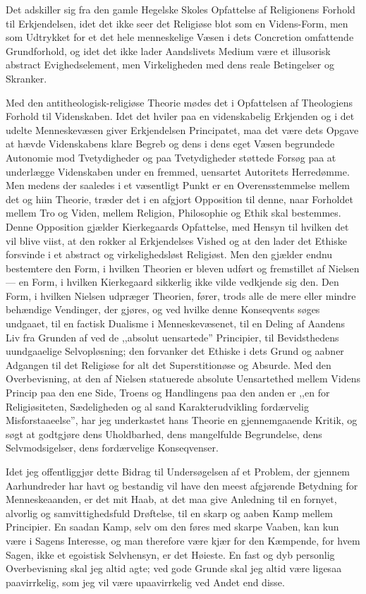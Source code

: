 \documentclass[12pt,a4paper]{article}
\begin{document}
Det adskiller sig fra den gamle Hegelske Skoles Opfattelse af
Religionens Forhold til Erkjendelsen, idet det ikke seer det Religiøse
blot som en Videns-Form, men som Udtrykket for et det hele menneskelige
Væsen i dets Concretion omfattende Grundforhold, og idet det ikke
lader Aandslivets Medium være et illusorisk abstract Evighedselement,
men Virkeligheden med dens reale Betingelser og Skranker.

Med den antitheologisk-religiøse Theorie mødes det i Opfattelsen af
Theologiens Forhold til Videnskaben. Idet det hviler paa en
videnskabelig Erkjenden og i det udelte Menneskevæsen giver Erkjendelsen
Principatet, maa det være dets Opgave at hævde Videnskabens klare
Begreb og dens i dens eget Væsen begrundede Autonomie mod
Tvetydigheder og paa Tvetydigheder støttede Forsøg paa at underlægge
Videnskaben under en fremmed, uensartet Autoritets Herredømme. Men
medens der saaledes i et væsentligt Punkt er en Overensstemmelse
mellem det og hiin Theorie, træder det i en afgjort Opposition til
denne, naar Forholdet mellem Tro og Viden, mellem Religion, Philosophie
og Ethik skal bestemmes. Denne Opposition gjælder Kierkegaards
Opfattelse, med Hensyn til hvilken det vil blive viist, at den rokker
al Erkjendelses Vished og at den lader det Ethiske forsvinde i et
abstract og virkelighedsløst Religiøst. Men den gjælder endnu
bestemtere den Form, i hvilken Theorien er bleven udført og fremstillet
af Nielsen --- en Form, i hvilken Kierkegaard sikkerlig ikke vilde
vedkjende sig den. Den Form, i hvilken Nielsen udpræger Theorien,
fører, trods alle de mere eller mindre behændige Vendinger, der gjøres,
og ved hvilke denne Konseqvents søges undgaaet, til en factisk Dualisme
i Menneskevæsenet, til en Deling af Aandens Liv fra Grunden af ved de
,,absolut uensartede'' Principier, til Bevidsthedens uundgaaelige
Selvopløsning; den forvanker det Ethiske i dets Grund og aabner
Adgangen til det Religiøse for alt det Superstitionøse og Absurde. Med
den Overbevisning, at den af Nielsen statuerede absolute Uensartethed
mellem Videns Princip paa den ene Side, Troens og Handlingens paa den
anden er ,,en for Religiøsiteten, Sædeligheden og al sand
Karakterudvikling fordærvelig Misforstaaeelse'', har jeg underkastet
hans Theorie en gjennemgaaende Kritik, og søgt at godtgjøre dens
Uholdbarhed, dens mangelfulde Begrundelse, dens Selvmodsigelser, dens
fordærvelige Konseqvenser.

Idet jeg offentliggjør dette Bidrag til Undersøgelsen af et Problem,
der gjennem Aarhundreder har havt og bestandig vil have den meest
afgjørende Betydning for Menneskeaanden, er det mit Haab, at det maa
give Anledning til en fornyet, alvorlig og samvittighedsfuld Drøftelse,
til en skarp og aaben Kamp mellem Principier. En saadan Kamp, selv om
den føres med skarpe Vaaben, kan kun være i Sagens Interesse, og man
therefore være kjær for den Kæmpende, for hvem Sagen, ikke et
egoistisk Selvhensyn, er det Høieste. En fast og dyb personlig
Overbevisning skal jeg altid agte; ved gode Grunde skal jeg altid være
ligesaa paavirrkelig, som jeg vil være upaavirrkelig ved Andet end
disse.
\end{document}
